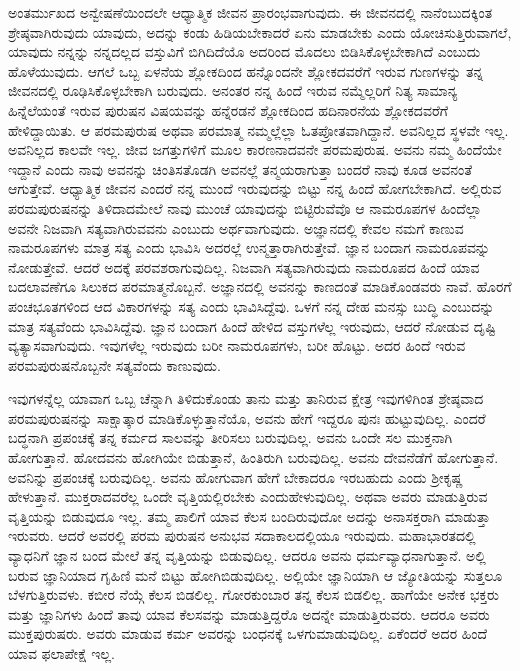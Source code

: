ಅಂತರ್ಮುಖದ ಅನ್ವೇಷಣೆಯಿಂದಲೇ ಆಧ್ಯಾತ್ಮಿಕ ಜೀವನ ಪ್ರಾರಂಭವಾಗುವುದು. ಈ ಜೀವನದಲ್ಲಿ ನಾನೆಂಬುದಕ್ಕಿಂತ ಶ್ರೇಷ್ಠವಾಗಿರುವುದು ಯಾವುದು, ಅದನ್ನು ಕಂಡು ಹಿಡಿಯ\-ಬೇಕಾದರೆ ಏನು ಮಾಡಬೇಕು ಎಂದು ಯೋಚಿಸುತ್ತಿರುವಾಗಲೆ, ಯಾವುದು ನನ್ನನ್ನು ನನ್ನದಲ್ಲದ ವಸ್ತುವಿಗೆ ಬಿಗಿದಿದೆಯೊ ಅದರಿಂದ ಮೊದಲು ಬಿಡಿಸಿಕೊಳ್ಳಬೇಕಾಗಿದೆ ಎಂಬುದು ಹೊಳೆಯುವುದು. ಆಗಲೆ ಒಬ್ಬ ಏಳನೆಯ ಶ್ಲೋಕದಿಂದ ಹನ್ನೊಂದನೇ ಶ್ಲೋಕದವರೆಗೆ ಇರುವ ಗುಣಗಳನ್ನು ತನ್ನ ಜೀವನದಲ್ಲಿ ರೂಢಿಸಿಕೊಳ್ಳಬೇಕಾಗಿ ಬರುವುದು. ಅನಂತರ ನನ್ನ ಹಿಂದೆ ಇರುವ ನಮ್ಮೆಲ್ಲರಿಗೆ ನಿತ್ಯ ಸಾಮಾನ್ಯ ಹಿನ್ನೆಲೆಯಂತೆ ಇರುವ ಪುರುಷನ ವಿಷಯವನ್ನು ಹನ್ನೆರಡನೆ ಶ್ಲೋಕದಿಂದ ಹದಿನಾರನೆಯ ಶ್ಲೋಕದವರೆಗೆ ಹೇಳಿದ್ದಾಯಿತು. ಆ ಪರಮಪುರುಷ ಅಥವಾ ಪರಮಾತ್ಮ ನಮ್ಮಲ್ಲೆಲ್ಲಾ ಓತಪ್ರೋತವಾಗಿದ್ದಾನೆ. ಅವನಿಲ್ಲದ ಸ್ಥಳವೇ ಇಲ್ಲ. ಅವನಿಲ್ಲದ ಕಾಲವೇ ಇಲ್ಲ. ಜೀವ ಜಗತ್ತುಗಳಿಗೆ ಮೂಲ ಕಾರಣನಾದವನೇ ಪರಮಪುರುಷ. ಅವನು ನಮ್ಮ ಹಿಂದೆಯೇ ಇದ್ದಾನೆ ಎಂದು ನಾವು ಅವನನ್ನು ಚಿಂತಿಸತೊಡಗಿ ಅವನಲ್ಲೆ ತನ್ಮಯರಾಗುತ್ತಾ ಬಂದರೆ ನಾವು ಕೂಡ ಅವನಂತೆ ಆಗುತ್ತೇವೆ. ಆಧ್ಯಾತ್ಮಿಕ ಜೀವನ ಎಂದರೆ ನನ್ನ ಮುಂದೆ ಇರುವುದನ್ನು ಬಿಟ್ಟು ನನ್ನ ಹಿಂದೆ ಹೋಗಬೇಕಾಗಿದೆ. ಅಲ್ಲಿರುವ ಪರಮಪುರುಷನನ್ನು ತಿಳಿದಾದಮೇಲೆ ನಾವು ಮುಂಚೆ ಯಾವುದನ್ನು ಬಿಟ್ಟಿರುವೆವೊ ಆ ನಾಮರೂಪಗಳ ಹಿಂದೆಲ್ಲಾ ಅವನೇ ನಿಜವಾಗಿ ಸತ್ಯವಾಗಿರುವವನು ಎಂಬುದು ಅರ್ಥವಾಗುವುದು. ಅಜ್ಞಾನದಲ್ಲಿ ಕೇವಲ ನಮಗೆ ಕಾಣುವ ನಾಮರೂಪಗಳು ಮಾತ್ರ ಸತ್ಯ ಎಂದು ಭಾವಿಸಿ ಅದರಲ್ಲೆ ಉನ್ಮತ್ತಾರಾಗಿರುತ್ತೇವೆ. ಜ್ಞಾನ ಬಂದಾಗ ನಾಮರೂಪವನ್ನು ನೋಡುತ್ತೇವೆ. ಆದರೆ ಅದಕ್ಕೆ ಪರವಶರಾಗುವುದಿಲ್ಲ. ನಿಜವಾಗಿ ಸತ್ಯವಾಗಿರುವುದು ನಾಮರೂಪದ ಹಿಂದೆ ಯಾವ ಬದಲಾವಣೆಗೂ ಸಿಲುಕದ ಪರಮಾತ್ಮನೊಬ್ಬನೆ. ಅಜ್ಞಾನದಲ್ಲಿ ಅವನನ್ನು ಕಾಣದಂತೆ ಮಾಡಿಕೊಂಡವರು ನಾವೆ. ಹೊರಗೆ ಪಂಚಭೂತಗಳಿಂದ ಆದ ವಿಕಾರಗಳನ್ನು ಸತ್ಯ ಎಂದು ಭಾವಿಸಿದ್ದೆವು. ಒಳಗೆ ನನ್ನ ದೇಹ ಮನಸ್ಸು ಬುದ್ಧಿ ಎಂಬುದನ್ನು ಮಾತ್ರ ಸತ್ಯವೆಂದು ಭಾವಿಸಿದ್ದೆವು. ಜ್ಞಾನ ಬಂದಾಗ ಹಿಂದೆ ಹೇಳಿದ ವಸ್ತುಗಳೆಲ್ಲ ಇರುವುದು, ಆದರೆ ನೋಡುವ ದೃಷ್ಟಿ ವ್ಯತ್ಯಾಸವಾಗುವುದು. ಇವುಗಳೆಲ್ಲ ಇರುವುದು ಬರೀ ನಾಮರೂಪಗಳು, ಬರೀ ಹೊಟ್ಟು. ಅದರ ಹಿಂದೆ ಇರುವ ಪರಮಪುರುಷನೊಬ್ಬನೇ ಸತ್ಯವೆಂದು ಕಾಣುವುದು.

ಇವುಗಳನ್ನೆಲ್ಲ ಯಾವಾಗ ಒಬ್ಬ ಚೆನ್ನಾಗಿ ತಿಳಿದುಕೊಂಡು ತಾನು ಮತ್ತು ತಾನಿರುವ ಕ್ಷೇತ್ರ ಇವುಗಳಿಗಿಂತ ಶ್ರೇಷ್ಠವಾದ ಪರಮಪುರುಷನನ್ನು ಸಾಕ್ಷಾತ್ಕಾರ ಮಾಡಿಕೊಳ್ಳುತ್ತಾನೆಯೊ, ಅವನು ಹೇಗೆ ಇದ್ದರೂ ಪುನಃ ಹುಟ್ಟುವುದಿಲ್ಲ. ಎಂದರೆ ಬದ್ಧನಾಗಿ ಪ್ರಪಂಚಕ್ಕೆ ತನ್ನ ಕರ್ಮದ ಸಾಲವನ್ನು ತೀರಿಸಲು ಬರುವುದಿಲ್ಲ. ಅವನು ಒಂದೇ ಸಲ ಮುಕ್ತನಾಗಿ ಹೋಗುತ್ತಾನೆ. ಹೋದವನು ಹೋಗಿಯೇ ಬಿಡುತ್ತಾನೆ, ಹಿಂತಿರುಗಿ ಬರುವುದಿಲ್ಲ. ಅವನು ದೇವನೆಡೆಗೆ ಹೋಗುತ್ತಾನೆ. ಅವನಿನ್ನು ಪ್ರಪಂಚಕ್ಕೆ ಬರುವುದಿಲ್ಲ. ಅವನು ಹೋಗುವಾಗ ಹೇಗೆ ಬೇಕಾದರೂ ಇರಬಹುದು ಎಂದು ಶ‍್ರೀಕೃಷ್ಣ ಹೇಳುತ್ತಾನೆ. ಮುಕ್ತರಾದವರೆಲ್ಲ ಒಂದೇ ವೃತ್ತಿಯಲ್ಲಿರಬೇಕು ಎಂದು\break ಹೇಳುವುದಿಲ್ಲ. ಅಥವಾ ಅವರು ಮಾಡುತ್ತಿರುವ ವೃತ್ತಿಯನ್ನು ಬಿಡುವುದೂ ಇಲ್ಲ. ತಮ್ಮ ಪಾಲಿಗೆ ಯಾವ ಕೆಲಸ ಬಂದಿರುವುದೋ ಅದನ್ನು ಅನಾಸಕ್ತರಾಗಿ ಮಾಡುತ್ತಾ ಇರುವರು. ಆದರೆ ಅವರಲ್ಲಿ ಪರಮ ಪುರುಷನ ಅನುಭವ ಸದಾಕಾಲದಲ್ಲಿಯೂ ಇರುವುದು. ಮಹಾಭಾರತದಲ್ಲಿ ವ್ಯಾಧನಿಗೆ ಜ್ಞಾನ ಬಂದ ಮೇಲೆ ತನ್ನ ವೃತ್ತಿಯನ್ನು ಬಿಡುವುದಿಲ್ಲ. ಆದರೂ ಅವನು ಧರ್ಮವ್ಯಾಧನಾಗುತ್ತಾನೆ. ಅಲ್ಲಿ ಬರುವ ಜ್ಞಾನಿಯಾದ ಗೃಹಿಣಿ ಮನೆ ಬಿಟ್ಟು ಹೋಗಿಬಿಡುವುದಿಲ್ಲ. ಅಲ್ಲಿಯೇ ಜ್ಞಾನಿಯಾಗಿ ಆ ಜ್ಯೋತಿಯನ್ನು ಸುತ್ತಲೂ ಬೆಳಗುತ್ತಿರುವಳು. ಕಬೀರ ನೆಯ್ಗೆ ಕೆಲಸ ಬಿಡಲಿಲ್ಲ. ಗೋರಕುಂಬಾರ ತನ್ನ ಕೆಲಸ ಬಿಡಲಿಲ್ಲ. ಹಾಗೆಯೇ ಅನೇಕ ಭಕ್ತರು ಮತ್ತು ಜ್ಞಾನಿಗಳು ಹಿಂದೆ ತಾವು ಯಾವ ಕೆಲಸವನ್ನು ಮಾಡುತ್ತಿದ್ದರೊ ಅದನ್ನೇ ಮಾಡುತ್ತಿರುವರು. ಆದರೂ ಅವರು ಮುಕ್ತಪುರುಷರು. ಅವರು ಮಾಡುವ ಕರ್ಮ ಅವರನ್ನು ಬಂಧನಕ್ಕೆ ಒಳಗುಮಾಡುವುದಿಲ್ಲ. ಏಕೆಂದರೆ ಅದರ ಹಿಂದೆ ಯಾವ ಫಲಾಪೇಕ್ಷೆ ಇಲ್ಲ.

